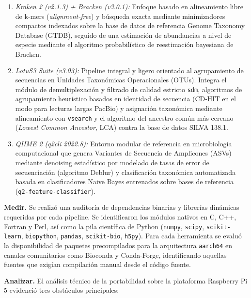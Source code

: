 \documentclass[12pt,oneside,spanish]{book}
\begin{document}
    \begin{enumerate}
        \item \textit{Kraken 2 (v2.1.3) + Bracken (v3.0.1):} Enfoque basado en alineamiento libre de k-mers (\textit{alignment-free}) y búsqueda exacta mediante minimizadores compactos indexados sobre la base de datos de referencia Genome Taxonomy Database (GTDB), seguido de una estimación de abundancias a nivel de especie mediante el algoritmo probabilístico de reestimación bayesiana de Bracken.
        
        \item \textit{LotuS3 Suite (v3.03):} Pipeline integral y ligero orientado al agrupamiento de secuencias en Unidades Taxonómicas Operacionales (OTUs). Integra el módulo de demultiplexación y filtrado de calidad estricto \texttt{sdm}, algoritmos de agrupamiento heurístico basados en identidad de secuencia (CD-HIT en el modo para lecturas largas PacBio) y asignación taxonómica mediante alineamiento con \texttt{vsearch} y el algoritmo del ancestro común más cercano (\textit{Lowest Common Ancestor}, LCA) contra la base de datos SILVA 138.1.
        
        \item \textit{QIIME 2 (q2cli 2022.8):} Entorno modular de referencia en microbiología computacional que genera Variantes de Secuencia de Amplicones (ASVs) mediante denoising estadístico por modelado de tasas de error de secuenciación (algoritmo Deblur) y clasificación taxonómica automatizada basada en clasificadores Naive Bayes entrenados sobre bases de referencia (\texttt{q2-feature-classifier}).    
    \end{enumerate}
    
    
    \textbf{Medir.} Se realizó una auditoría de dependencias binarias y librerías dinámicas requeridas por cada pipeline. Se identificaron los módulos nativos en C, C++, Fortran y Perl, así como la pila científica de Python (\texttt{numpy}, \texttt{scipy}, \texttt{scikit-learn}, \texttt{biopython}, \texttt{pandas}, \texttt{scikit-bio}, \texttt{h5py}). Para cada herramienta se evaluó la disponibilidad de paquetes precompilados para la arquitectura \texttt{aarch64} en canales comunitarios como Bioconda y Conda-Forge, identificando aquellas fuentes que exigían compilación manual desde el código fuente.
    
    \textbf{Analizar.} El análisis técnico de la portabilidad sobre la plataforma Raspberry Pi 5 evidenció tres obstáculos principales:
    
\end{document}
